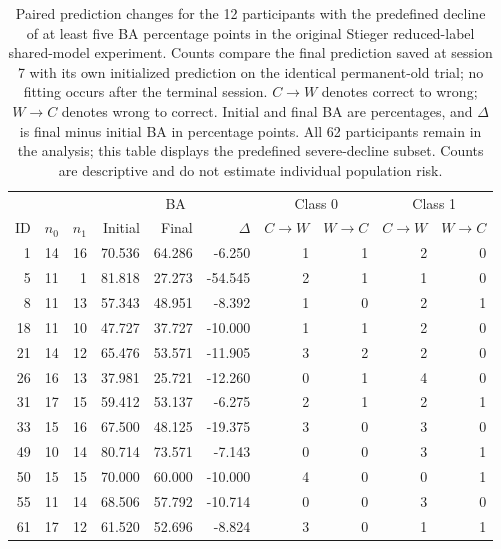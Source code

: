 \documentclass[11pt,a4paper]{article}
\begin{document}
\begin{table}[htbp]
\centering
\small
\setlength{\tabcolsep}{3pt}
\caption{Paired prediction changes for the 12 participants with the predefined decline of at least five BA percentage points in the original Stieger reduced-label shared-model experiment. Counts compare the final prediction saved at session 7 with its own initialized prediction on the identical permanent-old trial; no fitting occurs after the terminal session. $C\!\to\!W$ denotes correct to wrong; $W\!\to\!C$ denotes wrong to correct. Initial and final BA are percentages, and $\Delta$ is final minus initial BA in percentage points. All 62 participants remain in the analysis; this table displays the predefined severe-decline subset. Counts are descriptive and do not estimate individual population risk.}
\label{tab:old-test-paired-flips}
\begin{tabular}{@{}rrr rrr rrrr@{}}
\toprule
 & & & \multicolumn{3}{c}{BA} & \multicolumn{2}{c}{Class 0} & \multicolumn{2}{c}{Class 1}\\
\cmidrule(lr){4-6}\cmidrule(lr){7-8}\cmidrule(l){9-10}
ID & $n_0$ & $n_1$ & Initial & Final & $\Delta$ & $C\!\to\!W$ & $W\!\to\!C$ & $C\!\to\!W$ & $W\!\to\!C$\\
\midrule
1 & 14 & 16 & 70.536 & 64.286 & -6.250 & 1 & 1 & 2 & 0\\
5 & 11 & 1 & 81.818 & 27.273 & -54.545 & 2 & 1 & 1 & 0\\
8 & 11 & 13 & 57.343 & 48.951 & -8.392 & 1 & 0 & 2 & 1\\
18 & 11 & 10 & 47.727 & 37.727 & -10.000 & 1 & 1 & 2 & 0\\
21 & 14 & 12 & 65.476 & 53.571 & -11.905 & 3 & 2 & 2 & 0\\
26 & 16 & 13 & 37.981 & 25.721 & -12.260 & 0 & 1 & 4 & 0\\
31 & 17 & 15 & 59.412 & 53.137 & -6.275 & 2 & 1 & 2 & 1\\
33 & 15 & 16 & 67.500 & 48.125 & -19.375 & 3 & 0 & 3 & 0\\
49 & 10 & 14 & 80.714 & 73.571 & -7.143 & 0 & 0 & 3 & 1\\
50 & 15 & 15 & 70.000 & 60.000 & -10.000 & 4 & 0 & 0 & 1\\
55 & 11 & 14 & 68.506 & 57.792 & -10.714 & 0 & 0 & 3 & 0\\
61 & 17 & 12 & 61.520 & 52.696 & -8.824 & 3 & 0 & 1 & 1\\
\bottomrule
\end{tabular}
\end{table}
\end{document}
